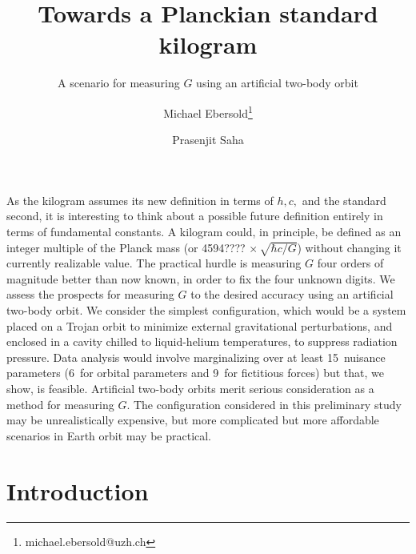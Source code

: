 \documentclass[onecolumn]{aa} %
\begin{document}
 


\title{Towards a Planckian standard kilogram}
\subtitle{A scenario for measuring $G$ using an artificial two-body orbit}

\author{Michael Ebersold\thanks{michael.ebersold@uzh.ch}%
        \and
        Prasenjit Saha%
       }


\date{}

\abstract
{As the kilogram assumes its new definition in terms of $h,c,$ and the
  standard second, it is interesting to think about a possible future
  definition entirely in terms of fundamental constants.  A kilogram
  could, in principle, be defined as an integer multiple of the Planck
  mass (or 4594????$\,\times\sqrt{\hbar c/G}$) without changing it
  currently realizable value.  The practical hurdle is measuring $G$
  four orders of magnitude better than now known, in order to fix the
  four unknown digits.}
{We assess the prospects for measuring $G$ to the desired accuracy
  using an artificial two-body orbit.}
{We consider the simplest configuration, which would be a system
  placed on a Trojan orbit to minimize external gravitational
  perturbations, and enclosed in a cavity chilled to liquid-helium
  temperatures, to suppress radiation pressure.}
{Data analysis would involve marginalizing over at least 15~nuisance
  parameters (6~for orbital parameters and 9~for fictitious forces)
  but that, we show, is feasible.}
{Artificial two-body orbits merit serious consideration as a method
  for measuring $G$.  The configuration considered in this preliminary
  study may be unrealistically expensive, but more complicated but
  more affordable scenarios in Earth orbit may be practical.}

\keywords{}

\maketitle

\section{Introduction}
\end{document}
